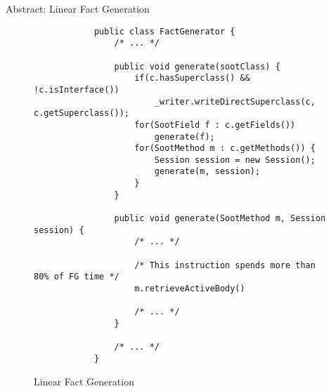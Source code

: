 \documentclass{dithesis}
\begin{document}
    Abstract: Linear Fact Generation

    \begin{figure}[H]
        \begin{lstlisting}
            public class FactGenerator {
                /* ... */

                public void generate(sootClass) {
                    if(c.hasSuperclass() && !c.isInterface())
                        _writer.writeDirectSuperclass(c, c.getSuperclass());
                    for(SootField f : c.getFields())
                        generate(f);
                    for(SootMethod m : c.getMethods()) {
                        Session session = new Session();
                        generate(m, session);
                    }
                }

                public void generate(SootMethod m, Session session) {
                    /* ... */
                    
                    /* This instruction spends more than 80% of FG time */
                    m.retrieveActiveBody() 
                    
                    /* ... */
                }

                /* ... */
            }
        \end{lstlisting}
    \caption{Linear Fact Generation}
    \end{figure}
\end{document}

